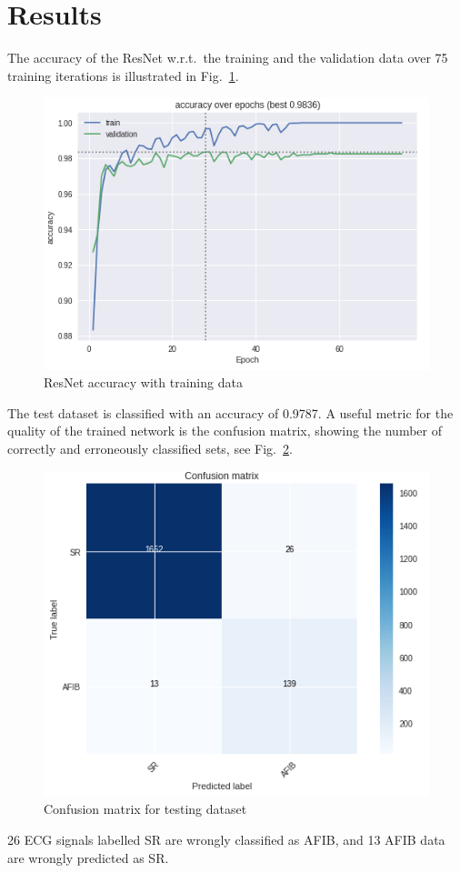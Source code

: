 \documentclass[11pt]{article}
\begin{document}
\section*{Results}
The accuracy of the ResNet w.r.t.\ the training and the validation data over 75
training iterations is illustrated in Fig.~\ref{fig:accu}.
\begin{figure}[htpb]
    \centering
    \includegraphics[width=0.8\linewidth]{accuracy}
    \caption{ResNet accuracy with training data}%
    \label{fig:accu}
\end{figure}

The test dataset is classified with an accuracy of 0.9787.
A useful metric for the quality of the trained network is the confusion matrix,
showing the number of correctly and erroneously classified sets, see
Fig.~\ref{fig:conf}.
\begin{figure}[htpb]
    \centering
    \includegraphics[width=0.8\linewidth]{confusion}
    \caption{Confusion matrix for testing dataset}%
    \label{fig:conf}
\end{figure}
26 ECG signals labelled SR are wrongly
classified as AFIB, and 13 AFIB data are wrongly predicted as SR.

\printbibliography
\end{document}
